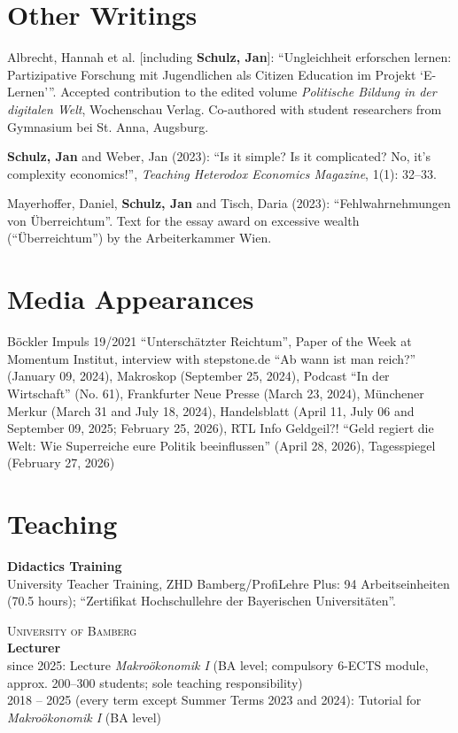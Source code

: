 \documentclass[margin]{res}
\begin{document}
\begin{resume}
	
	
	\section{Other Writings}
	Albrecht, Hannah et al. [including \textbf{Schulz, Jan}]: 
	``Ungleichheit erforschen \mbox{lernen}: Partizipative Forschung mit Jugendlichen als Citizen Education im \mbox{Projekt} \textquoteleft{}\mbox{E-Lernen}\textquoteright{}''.
	Accepted contribution to the edited volume \textit{Politische Bildung in der digitalen Welt}, Wochenschau Verlag.
	Co-authored with student researchers from Gymnasium bei St. Anna, Augsburg.
	
	\textbf{Schulz, Jan} and Weber, Jan (2023): ``Is it simple? Is it complicated? No, it's complexity economics!'', \emph{Teaching Heterodox Economics Magazine}, 1(1): 32--33.
	
	Mayerhoffer, Daniel, \textbf{Schulz, Jan} and Tisch, Daria (2023): ``Fehlwahrnehmungen von \"Uberreichtum''. Text for the essay award on excessive wealth (``\"Uberreichtum'') by the Arbeiterkammer Wien.
	\newpage
	\section{Media Appearances} 
	B\"ockler Impuls 19/2021 ``Untersch\"atzter Reichtum'', Paper of the Week at Momentum Institut, interview with stepstone.de ``Ab wann ist man reich?'' (January 09, 2024), Makroskop (September 25, 2024), Podcast ``In der Wirtschaft'' (No. 61), Frankfurter Neue Presse (March 23, 2024), M\"unchener Merkur (March 31 and July 18, 2024), Handelsblatt (April 11, July 06 and September 09, 2025; February 25, 2026), RTL Info Geldgeil?! ``Geld regiert die Welt: Wie Superreiche eure Politik beeinflussen'' (April 28, 2026), Tagesspiegel (February 27, 2026)

	\section{Teaching} \textbf{Didactics Training}\\
	University Teacher Training, ZHD Bamberg/ProfiLehre Plus: 94 Arbeitseinheiten (70.5 hours); ``Zertifikat Hochschullehre der Bayerischen Universit\"aten''.
	
	\textsc{University of Bamberg} \\
	\textbf{Lecturer} \\
	since 2025: Lecture \textit{Makro\"okonomik I} (BA level; compulsory 6-ECTS module, approx. 200--300 students; sole  teaching responsibility)\\
	2018 -- 2025 (every term except Summer Terms 2023 and 2024): Tutorial for \textit{Makro\"okonomik I} (BA level)
	

\end{resume}
\end{document}
